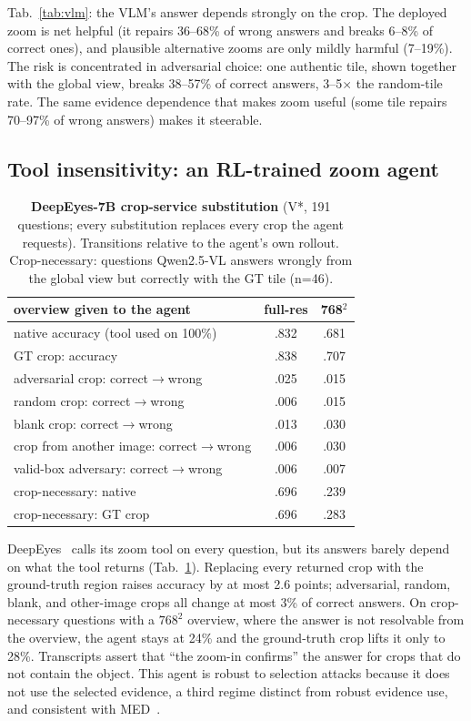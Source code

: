 \documentclass[10pt,twocolumn,letterpaper]{article}
\begin{document}
Tab.~\ref{tab:vlm}: the VLM's answer depends strongly on the crop. The deployed zoom is net helpful (it repairs 36--68\% of wrong answers and breaks 6--8\% of correct ones), and plausible alternative zooms are only mildly harmful (7--19\%). The risk is concentrated in adversarial choice: one authentic tile, shown together with the global view, breaks 38--57\% of correct answers, 3--5$\times$ the random-tile rate. The same evidence dependence that makes zoom useful (some tile repairs 70--97\% of wrong answers) makes it steerable.

\subsection{Tool insensitivity: an RL-trained zoom agent}
\begin{table}[t]\centering\small
\caption{\textbf{DeepEyes-7B crop-service substitution} (V*, 191 questions; every substitution replaces every crop the agent requests). Transitions relative to the agent's own rollout. Crop-necessary: questions Qwen2.5-VL answers wrongly from the global view but correctly with the GT tile (n=46).}\label{tab:deepeyes}
\setlength{\tabcolsep}{3pt}
\begin{tabular}{@{}lcc@{}}\toprule
overview given to the agent & full-res & 768$^2$\\\midrule
native accuracy (tool used on 100\%) & .832 & .681\\
GT crop: accuracy & .838 & .707\\
adversarial crop: correct$\to$wrong & .025 & .015\\
random crop: correct$\to$wrong & .006 & .015\\
blank crop: correct$\to$wrong & .013 & .030\\
crop from another image: correct$\to$wrong & .006 & .030\\
valid-box adversary: correct$\to$wrong & .006 & .007\\\midrule
crop-necessary: native & .696 & .239\\
crop-necessary: GT crop & .696 & .283\\\bottomrule
\end{tabular}\end{table}

DeepEyes~\cite{zheng2025deepeyes} calls its zoom tool on every question, but its answers barely depend on what the tool returns (Tab.~\ref{tab:deepeyes}). Replacing every returned crop with the ground-truth region raises accuracy by at most 2.6 points; adversarial, random, blank, and other-image crops all change at most 3\% of correct answers. On crop-necessary questions with a $768^2$ overview, where the answer is not resolvable from the overview, the agent stays at 24\% and the ground-truth crop lifts it only to 28\%. Transcripts assert that ``the zoom-in confirms'' the answer for crops that do not contain the object. This agent is robust to selection attacks because it does not use the selected evidence, a third regime distinct from robust evidence use, and consistent with MED~\cite{med2026}.
\end{document}
